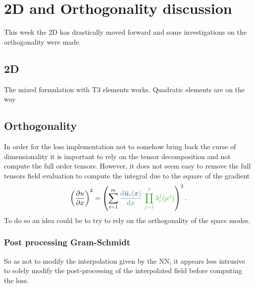 \chapter[The 22$^{\text{nd}}$ of March 2024 - 2D and Orthogonality discussion]{2D and Orthogonality discussion}
\label{Chap_22_03_24}
\begin{chapabstract}
    This week the 2D has drastically moved forward and some investigations on the orthogonality were made. 
\end{chapabstract}

\minitoc

\section{2D}

The mixed formulation with T3 elements works. Quadratic elements are on the way

\section{Orthogonality}
\label{sec:orthogonality}
 In order for the loss implementation not to somehow bring back the curse of dimensionality it is important to rely on the tensor decomposition and not compute the full order tensors. However, it does not seem easy to remove the full tensors field evaluation to compute the integral due to the square of the gradient 
 \begin{equation}
     \left( \frac{\partial u}{\partial x} \right)^2 = \left( \sum\limits_{i=1}^m \textcolor{BleuLMS!70}{\frac{\mathrm{d}\overline{\vect{u}}_i(\vect{x}) }{\mathrm{d}x}} ~\textcolor{LGreenLMS}{\prod_{j=1}^{\beta}\lambda_i^j(\mu^j)} \right)^2.
 \end{equation}
 To do so an idea could be to try to rely on  the orthogonality of the space modes.
 
\subsection{Post processing Gram-Schmidt}
So as not to modify the interpolation given by the NN, it appears less intrusive to solely modify the post-processing of the interpolated field before computing the loss.

